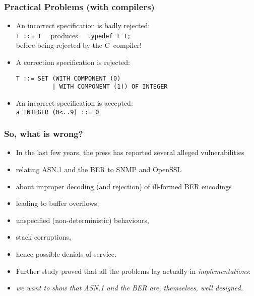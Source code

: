 \documentclass[compress,dvips,xcolor={dvipsnames},t]{beamer}
\newcommand\ASN{\textsf{ASN.1}\xspace}
\begin{document}
\begin{frame}[containsverbatim]
\frametitle{Practical Problems (with compilers)}

\begin{itemize}

   \item An incorrect specification is badly rejected: \\
         \verb+T ::= T+ \ \ produces \ \ \verb+typedef T T;+ \\ 
         before being rejected by the C~compiler!

   \item A correction specification is rejected:
\begin{verbatim}
T ::= SET (WITH COMPONENT (0) 
          | WITH COMPONENT (1)) OF INTEGER
\end{verbatim}

           \item An incorrect specification is accepted:\\
                 \verb+a INTEGER (0<..9) ::= 0+
\end{itemize}

\end{frame}

\begin{frame}
\frametitle{So, what is wrong?}

\begin{itemize}

  \item In the last few years, the press has reported several alleged
  vulnerabilities

  \item relating \ASN and the BER to SNMP and OpenSSL

  \item about improper decoding (and rejection) of ill-formed BER
  encodings

  \item leading to buffer overflows,

  \item unspecified (non-deterministic) behaviours,

  \item stack corruptions,

  \item hence possible denials of service.

  \item Further study proved that all the problems lay actually in
  \emph{implementations}:

  \item \emph{we want to show that \ASN and the BER are, themselves,
  well designed.}

\end{itemize}

\end{frame}
\end{document}
